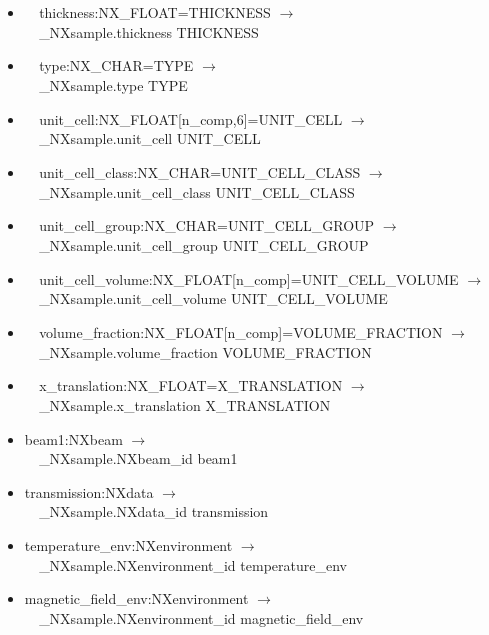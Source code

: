 \documentclass[11pt]{article}
\begin{document}
{{\begin{itemize}
\item{\verb|  |thickness:NX\_FLOAT=THICKNESS $\rightarrow$\\
\verb|  |\_NXsample.thickness THICKNESS}

\item{\verb|  |type:NX\_CHAR=TYPE $\rightarrow$\\
\verb|  |\_NXsample.type TYPE}

\item{\verb|  |unit\_cell:NX\_FLOAT[n\_comp,6]=UNIT\_CELL $\rightarrow$\\
\verb|  |\_NXsample.unit\_cell UNIT\_CELL}

\item{\verb|  |unit\_cell\_class:NX\_CHAR=UNIT\_CELL\_CLASS $\rightarrow$\\
\verb|  |\_NXsample.unit\_cell\_class UNIT\_CELL\_CLASS}

\item{\verb|  |unit\_cell\_group:NX\_CHAR=UNIT\_CELL\_GROUP $\rightarrow$\\
\verb|  |\_NXsample.unit\_cell\_group UNIT\_CELL\_GROUP}

\item{\verb|  |unit\_cell\_volume:NX\_FLOAT[n\_comp]=UNIT\_CELL\_VOLUME $\rightarrow$\\
\verb|  |\_NXsample.unit\_cell\_volume UNIT\_CELL\_VOLUME}

\item{\verb|  |volume\_fraction:NX\_FLOAT[n\_comp]=VOLUME\_FRACTION $\rightarrow$\\
\verb|  |\_NXsample.volume\_fraction VOLUME\_FRACTION}

\item{\verb|  |x\_translation:NX\_FLOAT=X\_TRANSLATION $\rightarrow$\\
\verb|  |\_NXsample.x\_translation X\_TRANSLATION}

\item{beam1:NXbeam $\rightarrow$\\
\verb|  |\_NXsample.NXbeam\_id beam1}

\item{transmission:NXdata $\rightarrow$\\
\verb|  |\_NXsample.NXdata\_id transmission}

\item{temperature\_env:NXenvironment $\rightarrow$\\
\verb|  |\_NXsample.NXenvironment\_id temperature\_env}

\item{magnetic\_field\_env:NXenvironment $\rightarrow$\\
\verb|  |\_NXsample.NXenvironment\_id magnetic\_field\_env}


\end{itemize}}}
\end{document}
